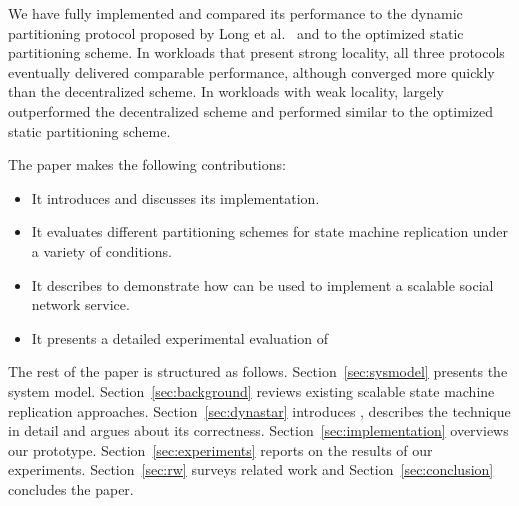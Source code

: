 {%

We have fully implemented \dynastar and compared its performance to
the dynamic partitioning protocol proposed by Long et
al.~\cite{hoang2016} and to the optimized static partitioning scheme.
In workloads that present strong
locality, all three protocols eventually delivered comparable
performance, although \dynastar converged more quickly than the
decentralized scheme.  In workloads with weak locality,
\dynastar largely outperformed the decentralized scheme and performed
similar to the optimized static partitioning scheme.


The paper makes the following contributions:
\begin{itemize}
\item It introduces \dynastar and discusses its implementation. 
\item It evaluates different partitioning schemes for state machine replication under a variety of conditions.
\item It describes \appname{} to demonstrate how \dynastar can be used to implement a scalable social network service.
\item It presents a detailed experimental evaluation of \dynastar
\end{itemize}

The rest of the paper is structured as follows.
Section~\ref{sec:sysmodel} presents the system model.
Section~\ref{sec:background} reviews existing scalable state machine replication approaches.
Section~\ref{sec:dynastar} introduces \dynastar, describes the technique in detail and argues about its correctness.
Section~\ref{sec:implementation} overviews our prototype.
Section~\ref{sec:experiments} reports on the results of our experiments.
Section~\ref{sec:rw} surveys related work and
Section~\ref{sec:conclusion} concludes the paper.




}
